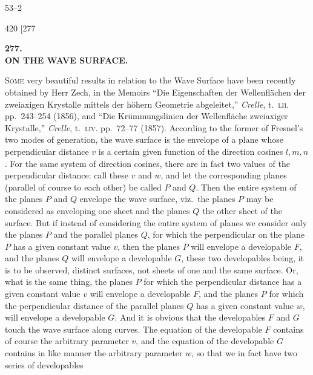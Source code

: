 \documentclass[11pt]{article}
\begin{document}
\hfill 53--2

\begin{center}
420 \hfill \hfill \textsc{[277}
\end{center}

\begin{center}
\textbf{\large 277.}\\[0.6em]
\textbf{ON THE WAVE SURFACE.}
\end{center}

\medskip
{}
\medskip

\textsc{Some} very beautiful results in relation to the Wave Surface have been recently
obtained by Herr Zech, in the Memoirs ``Die Eigenschaften der Wellenfl\"achen der zwei\-axigen
Krystalle mittels der h\"ohern Geometrie abgeleitet,'' \textit{Crelle}, t.~\textsc{lii.} pp.~243--254 (1856),
and ``Die Kr\"ummungslinien der Wellenfl\"ache zweiaxiger Krystalle,'' \textit{Crelle}, t.~\textsc{liv.} pp.~72--77
(1857). According to the former of Fresnel's two modes of generation, the
wave surface is the envelope of a plane whose perpendicular distance $v$ is a certain
given function of the direction cosines $l,m,n$. For the same system of direction
cosines, there are in fact two values of the perpendicular distance: call these $v$ and $w$,
and let the corresponding planes (parallel of course to each other) be called $P$ and $Q$.
Then the entire system of the planes $P$ and $Q$ envelope the wave surface, viz.\ the
planes $P$ may be considered as enveloping one sheet and the planes $Q$ the other
sheet of the surface. But if instead of considering the entire system of planes we
consider only the planes $P$ and the parallel planes $Q$, for which the perpendicular on
the plane $P$ has a given constant value $v$, then the planes $P$ will envelope a
developable $F$, and the planes $Q$ will envelope a developable $G$, these two developables
being, it is to be observed, distinct surfaces, not sheets of one and the same surface.
Or, what is the same thing, the planes $P$ for which the perpendicular distance has
a given constant value $v$ will envelope a developable $F$, and the planes $P$ for which
the perpendicular distance of the parallel planes $Q$ has a given constant value $w$, will
envelope a developable $G$. And it is obvious that the developables $F$ and $G$ touch
the wave surface along curves. The equation of the developable $F$ contains of course
the arbitrary parameter $v$, and the equation of the developable $G$ contains in like
manner the arbitrary parameter $w$, so that we in fact have two series of developables
\end{document}
